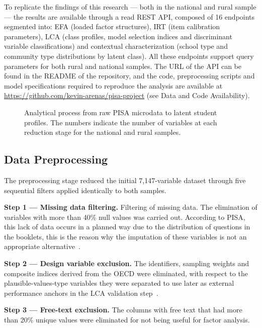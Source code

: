 \documentclass[runningheads]{llncs}
\begin{document}
To replicate the findings of this research --- both in the
national and rural sample --- the results are available through
a read REST API, composed of 16 endpoints segmented into: EFA
(loaded factor structures), IRT (item calibration parameters),
LCA (class profiles, model selection indices and discriminant
variable classifications) and contextual characterization
(school type and community type distributions by latent class).
All these endpoints support query parameters for both rural and
national samples. The URL of the API can be found in the README
of the repository, and the code, preprocessing scripts and model
specifications required to reproduce the analysis are available
at \url{https://github.com/kevin-arenas/pisa-project} (see Data
and Code Availability).

\begin{figure}[!htbp]
\centering

\caption{Analytical process from raw PISA microdata to latent
student profiles. The numbers indicate the number of variables
at each reduction stage for the national and rural samples.}
\label{fig:pipeline}
\end{figure}

\subsection{Data Preprocessing}

The preprocessing stage reduced the initial 7,147-variable
dataset through five sequential filters applied identically to
both samples.

\textbf{Step 1 --- Missing data filtering.} Filtering of missing
data. The elimination of variables with more than 40\% null
values was carried out. According to PISA, this lack of data
occurs in a planned way due to the distribution of questions in
the booklets, this is the reason why the imputation of these
variables is not an appropriate
alternative~\cite{oecd2024technical}.

\textbf{Step 2 --- Design variable exclusion.} The identifiers,
sampling weights and composite indices derived from the OECD
were eliminated, with respect to the plausible-values-type
variables they were separated to use later as external
performance anchors in the LCA validation
step~\cite{vondavier2009plausible}.

\textbf{Step 3 --- Free-text exclusion.} The columns with free
text that had more than 20\% unique values were eliminated for
not being useful for factor analysis.
\end{document}
